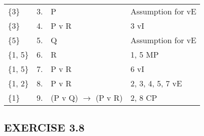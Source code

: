 \documentclass[a4paper,12pt]{article}
\newcommand{\ra}{$\rightarrow$ }
\begin{document}
\begin{enumerate}[label=\arabic*,leftmargin=*]
\begin{enumerate}[label=\arabic*.]
\begin{minipage}{\textwidth}
\begin{tabular}{l l l l}
                        \{3\} & 3. & P & Assumption for vE\\
                        \{3\} & 4. & P v R & 3 vI\\
                        \{5\} & 5. & Q & Assumption for vE\\
                        \{1, 5\} & 6. & R & 1, 5 MP\\
                        \{1, 5\} & 7. & P v R & 6 vI\\
                        \{1, 2\} & 8. & P v R & 2, 3, 4, 5, 7 vE\\
                        \{1\} & 9. & (P v Q) \ra (P v R) & 2, 8 CP\\
                    \end{tabular}
                \end{minipage}

        \end{enumerate}
    \end{enumerate}

    \subsection*{EXERCISE 3.8}
\end{document}
